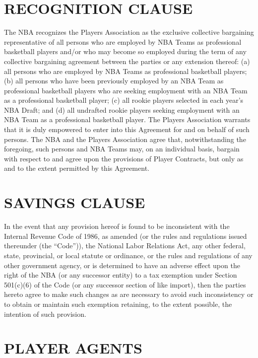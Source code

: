 \documentclass[
]{book}
\begin{document}
\hypertarget{recognition-clause}{%
\chapter{RECOGNITION CLAUSE}\label{recognition-clause}}

The NBA recognizes the Players Association as the exclusive collective bargaining representative of all persons who are employed by NBA Teams as professional basketball players and/or who may become so employed during the term of any collective bargaining agreement between the parties or any extension thereof: (a) all persons who are employed by NBA Teams as professional basketball players; (b) all persons who have been previously employed by an NBA Team as professional basketball players who are seeking employment with an NBA Team as a professional basketball player; (c) all rookie players selected in each year's NBA Draft; and (d) all undrafted rookie players seeking employment with an NBA Team as a professional basketball player. The Players Association warrants that it is duly empowered to enter into this Agreement for and on behalf of such persons. The NBA and the Players Association agree that, notwithstanding the foregoing, such persons and NBA Teams may, on an individual basis, bargain with respect to and agree upon the provisions of Player Contracts, but only as and to the extent permitted by this Agreement.

\hypertarget{savings-clause}{%
\chapter{SAVINGS CLAUSE}\label{savings-clause}}

In the event that any provision hereof is found to be inconsistent with the Internal Revenue Code of 1986, as amended (or the rules and regulations issued thereunder (the ``Code'')), the National Labor Relations Act, any other federal, state, provincial, or local statute or ordinance, or the rules and regulations of any other government agency, or is determined to have an adverse effect upon the right of the NBA (or any successor entity) to a tax exemption under Section 501(c)(6) of the Code (or any successor section of like import), then the parties hereto agree to make such changes as are necessary to avoid such inconsistency or to obtain or maintain such exemption retaining, to the extent possible, the intention of such provision.

\hypertarget{player-agents}{%
\chapter{PLAYER AGENTS}\label{player-agents}}
\end{document}
